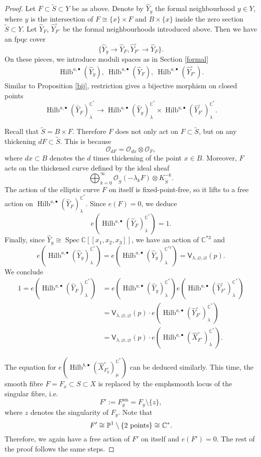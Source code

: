 \documentclass{amsart}
\theoremstyle{definition}
\newcommand{\CC} {\mathbb{C}}          %
\newcommand{\PP} {\mathbb{P}}
\renewcommand{\O}{\mathcal{O}}
\newcommand{\sfV}{\mathsf{V}}
\newcommand{\Hilb}{\operatorname{Hilb}}
\newcommand{\Spec}{\operatorname{Spec}}
\newcommand{\sm}{\operatorname{sm}}
\begin{document}
\begin{proof}
Let $F \subset \tilde{S} \subset Y$ be as above. Denote by $\widehat{Y}_{y}$ the formal neighbourhood $y \in Y$, where $y$ is the intersection of $F \cong \{x\} \times F$ and $B \times \{x\}$ inside the zero section $\tilde{S} \subset Y$. Let $\widehat{Y}_F$, $\widehat{Y}^{\circ}_{F^\circ}$ be the formal neighbourhoods introduced above. Then we have an fpqc cover
$$
\{\widehat{Y}_y \rightarrow \widehat{Y}_F, \widehat{Y}^{\circ}_{F^\circ} \rightarrow \widehat{Y}_F\}. 
$$
On these pieces, we introduce moduli spaces as in Section \ref{formal}
\begin{align*}
\Hilb^{a,\bullet}(\widehat{Y}_y), \ \Hilb^{a,\bullet}(\widehat{Y}_F), \ \Hilb^{a,\bullet}(\widehat{Y}^{\circ}_{F^\circ}).
\end{align*}
Similar to Proposition \ref{bij}, restriction gives a bijective morphism on closed points
$$
\Hilb^{a,\bullet}(\widehat{Y}_F)^{\CC^*}_{\lambda} \rightarrow \Hilb^{a,\bullet}(\widehat{Y}_y)^{\CC^*}_{\lambda} \times \Hilb^{a,\bullet}(\widehat{Y}^{\circ}_{F^\circ})^{\CC^*}_{\lambda}.
$$

Recall that $\tilde{S} = B \times F$. Therefore $F$ does not only act on $F \subset \tilde{S}$, but on any thickening $d F \subset \tilde{S}$. This is because
$$
\O_{dF} = \O_{d x} \otimes \O_F,
$$
where $dx \subset B$ denotes the $d$ times thickening of the point $x \in B$. Moreover, $F$ acts on the thickened curve defined by the ideal sheaf
$$
\bigoplus_{k=0}^{\infty} \O_{\tilde{S}}(-\lambda_k F) \otimes K_{\tilde{S}}^{-k}.
$$
The action of the elliptic curve $F$ on itself is fixed-point-free, so it lifts to a free action on $\Hilb^{a,\bullet}(\widehat{Y}_F)^{\CC^*}_{\lambda}$. Since $e(F) = 0$, we deduce
$$
e(\Hilb^{a,\bullet}(\widehat{Y}_F)^{\CC^*}_{\lambda}) = 1.
$$ 
Finally, since $\widehat{Y}_y \cong \Spec \CC[\![x_1,x_2,x_3]\!]$, we have an action of $\CC^{*3}$ and 
$$
e(\Hilb^{a,\bullet}(\widehat{Y}_y)^{\CC^*}_{\lambda}) = e(\Hilb^{a,\bullet}(\widehat{Y}_y)^{\CC^{*3}}_{\lambda}) = \sfV_{\lambda,\varnothing,\varnothing}(p).
$$
We conclude
\begin{align*}
1=e(\Hilb^{a,\bullet}(\widehat{Y}_F)^{\CC^*}_{\lambda}) &= e( \Hilb^{a,\bullet}(\widehat{Y}_y)^{\CC^*}_{\lambda}) e(\Hilb^{a,\bullet}(\widehat{Y}^{\circ}_{F^\circ})^{\CC^*}_{\lambda}) \\
&=  \sfV_{\lambda,\varnothing,\varnothing}(p) \cdot e(\Hilb^{a,\bullet}(\widehat{Y}^{\circ}_{F^\circ})^{\CC^*}_{\lambda}) \\
&=  \sfV_{\lambda,\varnothing,\varnothing}(p) \cdot e(\Hilb^{a,\bullet}(\widehat{X}^{\circ}_{F^\circ})^{\CC^*}_{\lambda}).
\end{align*}

The equation for $e(\Hilb^{b,\bullet}(\widehat{X}^{\circ}_{F_{y}^{\circ}})_{\mu}^{\CC^*})$ can be deduced similarly. This time, the smooth fibre $F = F_x \subset S \subset X$ is replaced by the emph{smooth locus} of the singular fibre, i.e.~ 
$$
F' := F_{y}^{\sm} = F_{y} \setminus \{z\},
$$
where $z$ denotes the singularity of $F_y$. Note that
$$
F' \cong \PP^1 \setminus \{2 \ \rm{points}\} \cong \CC^*.
$$
Therefore, we again have a free action of $F'$ on itself and $e(F') = 0$. The rest of the proof follows the same steps.
\end{proof}   
\end{document}
